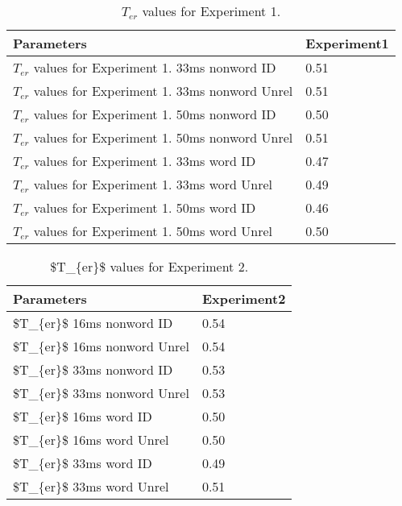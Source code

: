 \begin{appendix}
\begin{table}[tbp]
\begin{center}
\begin{threeparttable}
\caption{\label{tab:appendix_table_2}$T_{er}$ values for Experiment 1.}

\begin{tabular}{ll}
\toprule
Parameters & \multicolumn{1}{c}{Experiment1}\\
\midrule
$T_{er}$ values for Experiment 1.  33ms nonword ID & 0.51\\
$T_{er}$ values for Experiment 1. 33ms nonword Unrel & 0.51\\
$T_{er}$ values for Experiment 1.  50ms nonword ID & 0.50\\
$T_{er}$ values for Experiment 1. 50ms nonword Unrel & 0.51\\
$T_{er}$ values for Experiment 1.  33ms word ID & 0.47\\
$T_{er}$ values for Experiment 1. 33ms word Unrel & 0.49\\
$T_{er}$ values for Experiment 1.  50ms word ID & 0.46\\
$T_{er}$ values for Experiment 1. 50ms word Unrel & 0.50\\
\bottomrule
\end{tabular}

\end{threeparttable}
\end{center}

\end{table}

\begin{table}[tbp]

\begin{center}
\begin{threeparttable}

\caption{\label{tab:appendix_table_3} \$T\_\{er\}\$ values for Experiment 2.}

\begin{tabular}{ll}
\toprule
Parameters & \multicolumn{1}{c}{Experiment2}\\
\midrule
\$T\_\{er\}\$ 16ms nonword ID & 0.54\\
\$T\_\{er\}\$ 16ms nonword Unrel & 0.54\\
\$T\_\{er\}\$ 33ms nonword ID & 0.53\\
\$T\_\{er\}\$ 33ms nonword Unrel & 0.53\\
\$T\_\{er\}\$ 16ms word ID & 0.50\\
\$T\_\{er\}\$ 16ms word Unrel & 0.50\\
\$T\_\{er\}\$ 33ms word ID & 0.49\\
\$T\_\{er\}\$ 33ms word Unrel & 0.51\\
\bottomrule
\end{tabular}


\end{threeparttable}
\end{center}
\end{table}
\end{appendix}
